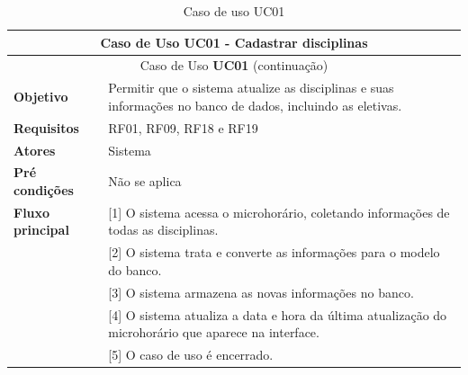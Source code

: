 \begin{longtable}{ | m{} | m{} | }
    \hline\hline
    \multicolumn{2}{|c|}{Caso de Uso \textbf{UC01} - Cadastrar disciplinas}\tabularnewline\hline\hline\endfirsthead
    \hline\hline
    \multicolumn{2}{|c|}{Caso de Uso \textbf{UC01} (continuação)}\tabularnewline\hline\hline\endhead
    \hline\endfoot
    \hline\caption{Caso de uso UC01}\endlastfoot

    \textbf{Objetivo} & Permitir que o sistema atualize as disciplinas e suas informações no banco de dados, incluindo as eletivas.\tabularnewline\hline 
    \textbf{Requisitos} & RF01, RF09, RF18 e RF19\tabularnewline\hline
    \textbf{Atores} & Sistema\tabularnewline\hline
    \textbf{Pré condições} & Não se aplica\tabularnewline\hline

    \multirow{1}{*}{\textbf{Fluxo principal}} & [1] O sistema acessa o microhorário, coletando informações de todas as disciplinas.\tabularnewline\cline{2-2}
    & [2] O sistema trata e converte as informações para o modelo do banco.\tabularnewline\cline{2-2}
    & [3] O sistema armazena as novas informações no banco.\tabularnewline\cline{2-2}
    & [4] O sistema atualiza a data e hora da última atualização do microhorário que aparece na interface.\tabularnewline\cline{2-2}
    & [5] O caso de uso é encerrado.
    \label{tab:uc01}
\end{longtable}


